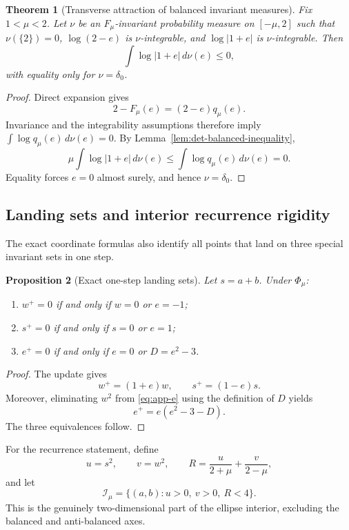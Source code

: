 \documentclass[11pt]{article}
\newtheorem{theorem}{Theorem}
\newtheorem{proposition}[theorem]{Proposition}
\begin{document}
\begin{theorem}[Transverse attraction of balanced invariant measures]
\label{thm:det-balanced-transverse}
Fix \(1<\mu<2\).  Let \(\nu\) be an \(F_\mu\)-invariant probability
measure on \([-\mu,2]\) such that \(\nu(\{2\})=0\),
\(\log(2-e)\) is \(\nu\)-integrable, and \(\log|1+e|\) is
\(\nu\)-integrable.  Then
\[
    \int\log|1+e|\,d\nu(e)\le0,
\]
with equality only for \(\nu=\delta_0\).
\end{theorem}

\begin{proof}
Direct expansion gives
\[
    2-F_\mu(e)=(2-e)q_\mu(e).
\]
Invariance and the integrability assumptions therefore imply
\(\int\log q_\mu(e)\,d\nu(e)=0\).  By
Lemma~\ref{lem:det-balanced-inequality},
\[
    \mu\int\log|1+e|\,d\nu(e)
    \le\int\log q_\mu(e)\,d\nu(e)=0.
\]
Equality forces \(e=0\) almost surely, and hence \(\nu=\delta_0\).
\end{proof}

\subsection{Landing sets and interior recurrence rigidity}

The exact coordinate formulas also identify all points that land on three
special invariant sets in one step.

\begin{proposition}[Exact one-step landing sets]
\label{prop:det-landing-sets}
Let \(s=a+b\).  Under \(\Phi_\mu\):
\begin{enumerate}[leftmargin=*,nosep]
    \item \(w^+=0\) if and only if \(w=0\) or \(e=-1\);
    \item \(s^+=0\) if and only if \(s=0\) or \(e=1\);
    \item \(e^+=0\) if and only if \(e=0\) or \(D=e^2-3\).
\end{enumerate}
\end{proposition}

\begin{proof}
The update gives
\[
    w^+=(1+e)w,
    \qquad
    s^+=(1-e)s.
\]
Moreover, eliminating \(w^2\) from \eqref{eq:app-e} using the definition
of \(D\) yields
\[
    e^+=e(e^2-3-D).
\]
The three equivalences follow.
\end{proof}

For the recurrence statement, define
\[
    u=s^2,\qquad v=w^2,\qquad
    R=\frac{u}{2+\mu}+\frac{v}{2-\mu},
\]
and let
\[
    \mathcal I_\mu
    =
    \{(a,b):u>0,\ v>0,\ R<4\}.
\]
This is the genuinely two-dimensional part of the ellipse interior,
excluding the balanced and anti-balanced axes.
\end{document}
